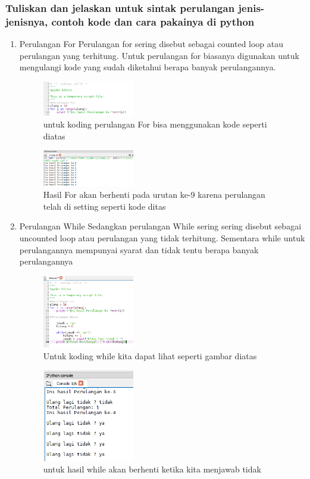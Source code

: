 \subsubsection{Tuliskan dan jelaskan untuk sintak perulangan jenis-jenisnya, contoh kode dan cara pakainya di python }
\begin{enumerate}
\item Perulangan For
\hfill \break
Perulangan for sering disebut sebagai counted loop atau perulangan yang terhitung. Untuk perulangan for biasanya digunakan untuk mengulangi kode yang sudah diketahui berapa banyak perulangannya.
\begin{figure}[H]
		\includegraphics[width=4cm]{figures/1184065/PerFor.PNG}
		\centering
		\caption{untuk koding perulangan  For bisa menggunakan kode seperti diatas}
\end{figure}
\begin{figure}[H]
		\includegraphics[width=4cm]{figures/1184065/PerForHasil.PNG}
		\centering
		\caption{Hasil For akan berhenti pada urutan ke-9 karena perulangan telah di setting seperti kode ditas}
\end{figure}
\item Perulangan While
\hfill \break
Sedangkan perulangan While sering sering disebut sebagai uncounted loop atau perulangan yang tidak terhitung. Sementara while untuk perulangannya mempunyai syarat dan tidak tentu berapa banyak perulangannya
\begin{figure}[H]
		\includegraphics[width=4cm]{figures/1184065/PerWhile.PNG}
		\centering
		\caption{Untuk koding while kita dapat lihat seperti gambar diatas}
\end{figure}
\begin{figure}[H]
		\includegraphics[width=4cm]{figures/1184065/PerWhileHasil.PNG}
		\centering
		\caption{untuk hasil while akan berhenti ketika kita menjawab tidak}
\end{figure}

\end{enumerate}
